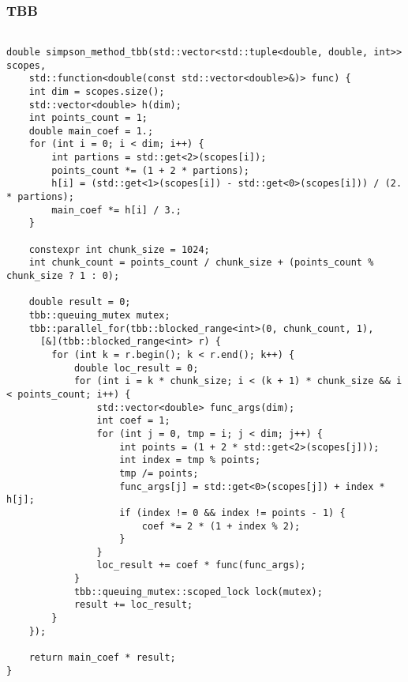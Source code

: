 \documentclass[14pt, a4paper]{extarticle}
\begin{document}
    \subsubsection{TBB}
  \begin{lstlisting}

double simpson_method_tbb(std::vector<std::tuple<double, double, int>> scopes,
    std::function<double(const std::vector<double>&)> func) {
    int dim = scopes.size();
    std::vector<double> h(dim);
    int points_count = 1;
    double main_coef = 1.;
    for (int i = 0; i < dim; i++) {
        int partions = std::get<2>(scopes[i]);
        points_count *= (1 + 2 * partions);
        h[i] = (std::get<1>(scopes[i]) - std::get<0>(scopes[i])) / (2. * partions);
        main_coef *= h[i] / 3.;
    }

    constexpr int chunk_size = 1024;
    int chunk_count = points_count / chunk_size + (points_count % chunk_size ? 1 : 0);

    double result = 0;
    tbb::queuing_mutex mutex;
    tbb::parallel_for(tbb::blocked_range<int>(0, chunk_count, 1),
      [&](tbb::blocked_range<int> r) {
        for (int k = r.begin(); k < r.end(); k++) {
            double loc_result = 0;
            for (int i = k * chunk_size; i < (k + 1) * chunk_size && i < points_count; i++) {
                std::vector<double> func_args(dim);
                int coef = 1;
                for (int j = 0, tmp = i; j < dim; j++) {
                    int points = (1 + 2 * std::get<2>(scopes[j]));
                    int index = tmp % points;
                    tmp /= points;
                    func_args[j] = std::get<0>(scopes[j]) + index * h[j];
                    if (index != 0 && index != points - 1) {
                        coef *= 2 * (1 + index % 2);
                    }
                }
                loc_result += coef * func(func_args);
            }
            tbb::queuing_mutex::scoped_lock lock(mutex);
            result += loc_result;
        }
    });

    return main_coef * result;
}

  \end{lstlisting}
  \newpage
\end{document}
